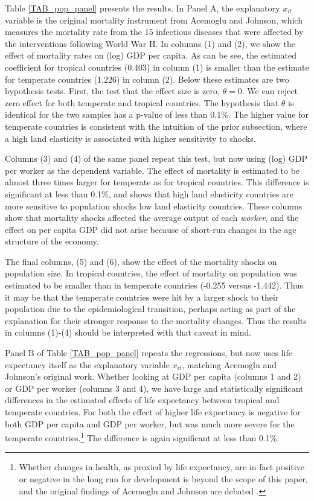 \documentclass[11pt]{article}
\begin{document}
Table \ref{TAB_pop_panel} presents the results. In Panel A, the explanatory $x_{it}$ variable is the original mortality instrument from Acemoglu and Johnson, which measures the mortality rate from the 15 infectious diseases that were affected by the interventions following World War II. In columns (1) and (2), we show the effect of mortality rates on (log) GDP per capita. As can be see, the estimated coefficient for tropical countries (0.403) in column (1) is smaller than the estimate for temperate countries (1.226) in column (2). Below these estimates are two hypothesis tests. First, the test that the effect size is zero, $\theta=0$. We can reject zero effect for both temperate and tropical countries. The hypothesis that $\theta$ is identical for the two samples has a p-value of less than 0.1\%. The higher value for temperate countries is consistent with the intuition of the prior subsection, where a high land elasticity is associated with higher sensitivity to shocks.

Columns (3) and (4) of the same panel repeat this test, but now using (log) GDP per worker as the dependent variable. The effect of mortality is estimated to be almost three times larger for temperate as for tropical countries. This difference is significant at less than 0.1\%, and shows that high land elasticity countries are more sensitive to population shocks low land elasticity countries. These columns show that mortality shocks affected the average output of each \textit{worker}, and the effect on per capita GDP did not arise because of short-run changes in the age structure of the economy.

The final columns, (5) and (6), show the effect of the mortality shocks on population size. In tropical countries, the effect of mortality on population was estimated to be smaller than in temperate countries (-0.255 versus -1.442). Thus it may be that the temperate countries were hit by a larger shock to their population due to the epidemiological transition, perhaps acting as part of the explanation for their stronger response to the mortality changes. Thus the results in columns (1)-(4) should be interpreted with that caveat in mind.

Panel B of Table \ref{TAB_pop_panel} repeats the regressions, but now uses life expectancy itself as the explanatory variable $x_{it}$, matching Acemoglu and Johnson's original work. Whether looking at GDP per capita (columns 1 and 2) or GDP per worker (columns 3 and 4), we have large and statistically significant differences in the estimated effects of life expectancy between tropical and temperate countries. For both the effect of higher life expectancy is negative for both GDP per capita and GDP per worker, but was much more severe for the temperate countries.\footnote{Whether changes in health, as proxied by life expectancy, are in fact positive or negative in the long run for development is beyond the scope of this paper, and the original findings of Acemoglu and Johnson are debated \citep{bcf2014}.} The difference is again significant at less than 0.1\%.
\end{document}

